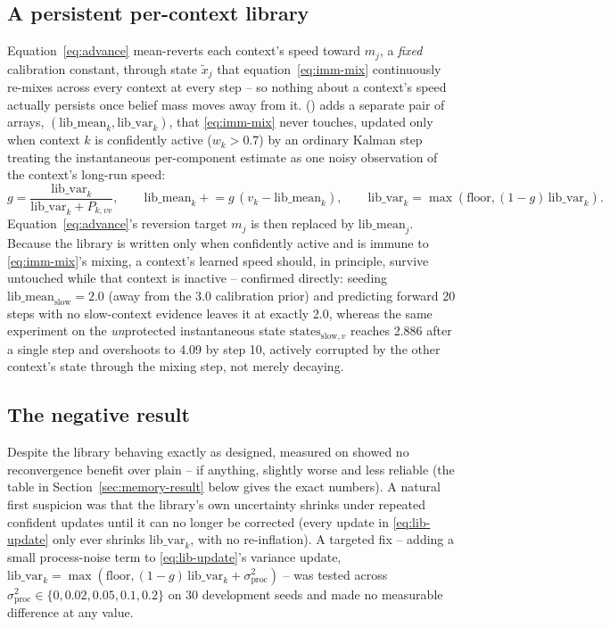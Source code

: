\documentclass[11pt,a4paper]{article}
\newcommand{\code}[1]{\texttt{\detokenize{#1}}}
\begin{document}
\subsection{A persistent per-context library}
\label{sec:library}
Equation~\eqref{eq:advance} mean-reverts each context's speed toward $m_j$, a
\emph{fixed} calibration constant, through state $\tilde x_j$ that
equation~\eqref{eq:imm-mix} continuously re-mixes across every context at every step --
so nothing about a context's speed actually persists once belief mass moves away from
it. \code{Belief} (\code{memory=True}) adds a separate pair of arrays,
$(\text{lib\_mean}_k,\text{lib\_var}_k)$, that \eqref{eq:imm-mix} never touches, updated
only when context $k$ is confidently active ($w_k>0.7$) by an ordinary Kalman step
treating the instantaneous per-component estimate as one noisy observation of the
context's long-run speed:
\begin{equation}\label{eq:lib-update}
g=\frac{\text{lib\_var}_k}{\text{lib\_var}_k+P_{k,vv}},\qquad
\text{lib\_mean}_k\mathrel{+}=g\,(v_k-\text{lib\_mean}_k),\qquad
\text{lib\_var}_k=\max(\text{floor},(1-g)\,\text{lib\_var}_k).
\end{equation}
Equation~\eqref{eq:advance}'s reversion target $m_j$ is then replaced by
$\text{lib\_mean}_j$. Because the library is written only when confidently active and
is immune to \eqref{eq:imm-mix}'s mixing, a context's learned speed should, in
principle, survive untouched while that context is inactive -- confirmed directly:
seeding $\text{lib\_mean}_{\text{slow}}=2.0$ (away from the 3.0 calibration prior) and
predicting forward 20 steps with no slow-context evidence leaves it at exactly 2.0,
whereas the same experiment on the \emph{un}protected instantaneous state
$\text{states}_{\text{slow},v}$ reaches 2.886 after a single step and overshoots to
4.09 by step 10, actively corrupted by the other context's state through the mixing
step, not merely decaying.

\subsection{The negative result}
\label{sec:memory-null}
Despite the library behaving exactly as designed, \code{ext1_memory} measured on
\code{repeated} showed no reconvergence benefit over plain \code{ext1} -- if anything,
slightly worse and less reliable (the table in Section~\ref{sec:memory-result} below gives the exact
numbers). A natural first suspicion was that the library's own uncertainty shrinks
under repeated confident updates until it can no longer be corrected (every update in
\eqref{eq:lib-update} only ever shrinks $\text{lib\_var}_k$, with no re-inflation). A
targeted fix -- adding a small process-noise term to \eqref{eq:lib-update}'s variance
update, $\text{lib\_var}_k=\max(\text{floor},(1-g)\,\text{lib\_var}_k+\sigma_{\text{proc}}^2)$
-- was tested across $\sigma_{\text{proc}}^2\in\{0,0.02,0.05,0.1,0.2\}$ on 30 development
seeds and made no measurable difference at any value.
\end{document}
